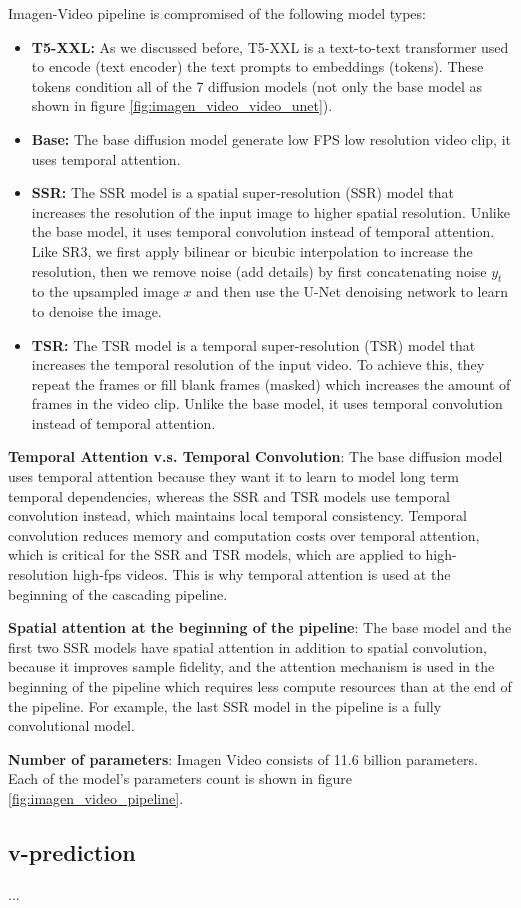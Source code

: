 Imagen-Video pipeline is compromised of the following model types:

\begin{itemize}
    \item \textbf{T5-XXL:} As we discussed before, T5-XXL is a text-to-text transformer used to encode (text encoder) the text prompts to embeddings (tokens). These tokens condition all of the 7 diffusion models (not only the base model as shown in figure \ref{fig:imagen_video_video_unet}).
    \item \textbf{Base:} The base diffusion model generate low FPS low resolution video clip, it uses temporal attention.
    \item \textbf{SSR:} The SSR model is a spatial super-resolution (SSR) model that increases the resolution of the input image to higher spatial resolution. Unlike the base model, it uses temporal convolution instead of temporal attention. Like SR3, we first apply bilinear or bicubic interpolation to increase the resolution, then we remove noise (add details) by first concatenating noise $y_t$ to the upsampled image $x$ and then use the U-Net denoising network to learn to denoise the image.
    \item \textbf{TSR:} The TSR model is a temporal super-resolution (TSR) model that increases the temporal resolution of the input video. To achieve this, they repeat the frames or fill blank frames (masked) which increases the amount of frames in the video clip. Unlike the base model, it uses temporal convolution instead of temporal attention.
\end{itemize}


\textbf{Temporal Attention v.s. Temporal Convolution}: The base diffusion model uses temporal attention because they want it to learn to model long term temporal dependencies, whereas the SSR and TSR models use temporal convolution instead, which maintains local temporal consistency. Temporal convolution reduces memory and computation costs over temporal attention, which is critical for the SSR and TSR models, which are applied to high-resolution high-fps videos. This is why temporal attention is used at the beginning of the cascading pipeline.

\textbf{Spatial attention at the beginning of the pipeline}: The base model and the first two SSR models have spatial attention in addition to spatial convolution, because it improves sample fidelity, and the attention mechanism is used in the beginning of the pipeline which requires less compute resources than at the end of the pipeline. For example, the last SSR model in the pipeline is a fully convolutional model.

\textbf{Number of parameters}: Imagen Video consists of 11.6 billion parameters. Each of the model's parameters count is shown in figure \ref{fig:imagen_video_pipeline}.





\subsection{v-prediction}

...